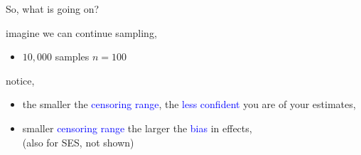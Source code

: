 \begin{lhframe}[rhgraphic={\texttt{[image: descendant8\_samplesize.pdf]}}]
	{So, what is going on?}
	
	imagine we can continue sampling,
	\begin{itemize}
		\item $10,000$ samples $n=100$
	\end{itemize}
	
	notice,
	\begin{itemize}
		\item the smaller the \textcolor{blue}{censoring range}, the \textcolor{blue}{less confident} you are of your estimates,
		\item smaller \textcolor{blue}{censoring range} the larger the \textcolor{blue}{bias} in effects, \\
		{\small (also for SES, not shown)}
	\end{itemize}
\end{lhframe}
%
%


